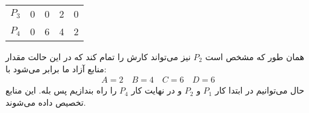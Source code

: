 \begin{enumerate}
\begin{center}
\begin{latin}
\begin{tabular}{c|c|c|c|c}
            $P_3$ & 0 & 0 & 2 & 0 \\
            $P_4$ & 0 & 6 & 4 & 2
        \end{tabular}
        \end{latin}
    \end{center}
    همان طور که مشخص است
    $P_2$
    نیز می‌تواند کارش را تمام کند که در این حالت مقدار منابع آزاد ما برابر می‌شود با:
    \begin{gather*}
        A = 2 \quad B = 4 \quad C = 6 \quad D = 6
    \end{gather*}
    حال می‌توانیم در ابتدا کار
    $P_1$ و $P_2$
    و در نهایت کار
    $P_4$
    را راه بندازیم پس بله. این منابع تخصیص داده می‌شوند.
\end{enumerate}